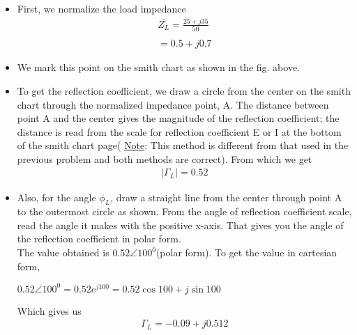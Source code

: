 \begin{itemize}
	\item First, we normalize the load impedance
    \begin{align*}
    \bar{Z_{L}}=\frac{25+j35}{50}\\\\
    =0.5+j0.7
    \end{align*}
	
	\item
	We mark this point on the smith chart as shown in the fig. above.
	
	\item
	To get the reflection coefficient, we draw a circle from the center on the smith chart through the normalized impedance point, A. The distance between point A and the center gives the magnitude of the reflection coefficient; the distance is read from the scale for reflection coefficient E or I at the bottom of the smith chart page( \underline{Note}: This method is different from that used in the previous problem and both methods are correct). From which we get
	\begin{align*}
	|\Gamma_{L}| = 0.52
	\end{align*}
	
	\item
	Also, for the angle $\phi_{L}$, draw a straight line from the center through point A to the outermost circle as shown. From the angle of reflection coefficient scale, read the angle it makes with the positive x-axis. That gives you the angle of the reflection coefficient in polar form.\\
	The value obtained is $0.52\angle100^{0}$(polar form). To get the value in cartesian form,
	\begin{center}
		$0.52\angle100^0 = 0.52e^{j100} = 0.52{\cos100 + j\sin100}$
	\end{center}
	 Which gives us
	 \begin{align*}
	 \Gamma_{L} = -0.09+j0.512
	 \end{align*}
	

\end{itemize}
